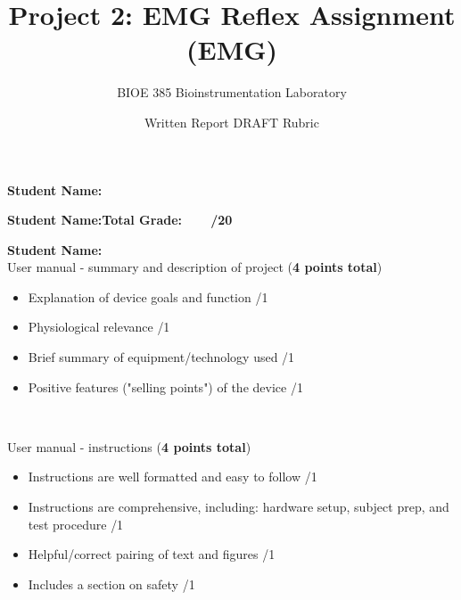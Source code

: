 \documentclass{article}
\title{Project 2: EMG Reflex Assignment (EMG)}
\author{BIOE 385 Bioinstrumentation Laboratory}
\date{Written Report DRAFT Rubric}
\begin{document}
\large
\maketitle

\textbf{Student Name:}\vspace{0.5cm}

\textbf{Student Name:}\hfill 	\textbf{Total Grade:\ \ \ \ \underline{\hspace{1cm}}/20}\vspace{0.5cm}

\textbf{Student Name:}\hfill\\

User manual - summary and description of project (\textbf{4 points total})
\begin{small}
\begin{itemize}
	\item Explanation of device goals and function \hfill \underline{\hspace{1cm}}/1
	\item Physiological relevance \hfill \underline{\hspace{1cm}}/1
	\item Brief summary of equipment/technology used \hfill \underline{\hspace{1cm}}/1
	\item Positive features ("selling points") of the device \hfill \underline{\hspace{1cm}}/1
\end{itemize}
\end{small}\

User manual - instructions (\textbf{4 points total})
\begin{small}
\begin{itemize}
	\item Instructions are well formatted and easy to follow \hfill \underline{\hspace{1cm}}/1
	\item Instructions are comprehensive, including: hardware setup, subject prep, and test procedure \hfill \underline{\hspace{1cm}}/1
	\item Helpful/correct pairing of text and figures \hfill \underline{\hspace{1cm}}/1
	\item Includes a section on safety \hfill \underline{\hspace{1cm}}/1
\end{itemize}
\end{small}\
\end{document}
